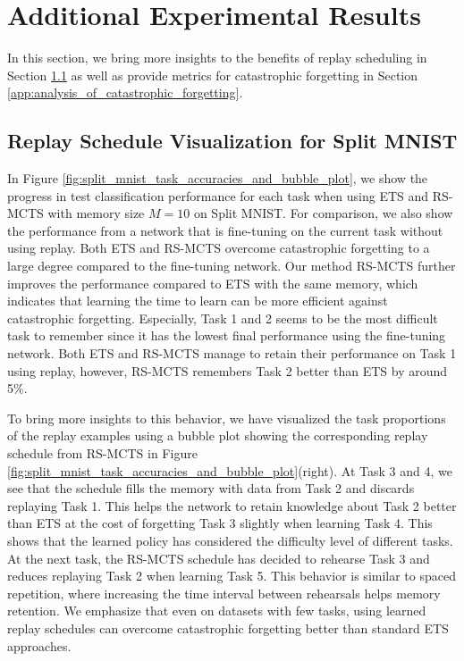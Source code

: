 
\section{Additional Experimental Results}
\label{app:additional_experimental_results}

In this section, we bring more insights to the benefits of replay scheduling in Section \ref{app:replay_schedule_visualization_for_split_mnist} as well as provide metrics for catastrophic forgetting in Section \ref{app:analysis_of_catastrophic_forgetting}.

\subsection{Replay Schedule Visualization for Split MNIST}
\label{app:replay_schedule_visualization_for_split_mnist}

In Figure \ref{fig:split_mnist_task_accuracies_and_bubble_plot}, we show the progress in test classification performance for each task when using ETS and RS-MCTS with memory size $M=10$ on Split MNIST. For comparison, we also show the performance from a network that is fine-tuning on the current task without using replay. Both ETS and RS-MCTS overcome catastrophic forgetting to a large degree compared to the fine-tuning network. Our method RS-MCTS further improves the performance compared to ETS with the same memory, which indicates that learning the time to learn can be more efficient against catastrophic forgetting. Especially, Task 1 and 2 seems to be the most difficult task to remember since it has the lowest final performance using the fine-tuning network. Both ETS and RS-MCTS manage to retain their performance on Task 1 using replay, however, RS-MCTS remembers Task 2 better than ETS by around 5\%. 

To bring more insights to this behavior, we have visualized the task proportions of the replay examples using a bubble plot showing the corresponding replay schedule from RS-MCTS in Figure \ref{fig:split_mnist_task_accuracies_and_bubble_plot}(right). At Task 3 and 4, we see that the schedule fills the memory with data from Task 2 and discards replaying Task 1. This helps the network to retain knowledge about Task 2 better than ETS at the cost of forgetting Task 3 slightly when learning Task 4. This shows that the learned policy has considered the difficulty level of different tasks. At the next task, the RS-MCTS schedule has decided to rehearse Task 3 and reduces replaying Task 2 when learning Task 5. This behavior is similar to spaced repetition, where increasing the time interval between rehearsals helps memory retention.
We emphasize that even on datasets with few tasks, using learned replay schedules can overcome catastrophic forgetting better than standard ETS approaches.



